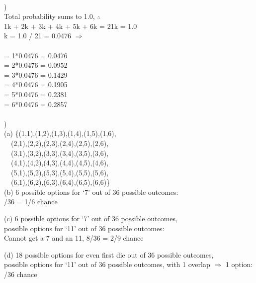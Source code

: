 \documentclass[12pt]{article}
\begin{document}
\hrulefill \\
\pagebreak


)\\
\indent \indent Total probability sums to 1.0, $\therefore$\\
\indent \indent 1k + 2k + 3k + 4k + 5k + 6k = 21k = 1.0\\
\indent \indent k = 1.0 / 21 = 0.0476 $\Rightarrow$\\\\
\indent \indent [1] = 1*0.0476 = 0.0476\\
\indent \indent [2] = 2*0.0476 = 0.0952\\
\indent \indent [3] = 3*0.0476 = 0.1429\\
\indent \indent [4] = 4*0.0476 = 0.1905\\
\indent \indent [5] = 5*0.0476 = 0.2381\\
\indent \indent [6] = 6*0.0476 = 0.2857\\


\hrulefill \\


)\\
\indent (a) \{(1,1),(1,2),(1,3),(1,4),(1,5),(1,6),\\
\indent \indent \  \ (2,1),(2,2),(2,3),(2,4),(2,5),(2,6),\\
\indent \indent \  \ (3,1),(3,2),(3,3),(3,4),(3,5),(3,6),\\
\indent \indent \  \ (4,1),(4,2),(4,3),(4,4),(4,5),(4,6),\\
\indent \indent \  \ (5,1),(5,2),(5,3),(5,4),(5,5),(5,6),\\
\indent \indent \  \ (6,1),(6,2),(6,3),(6,4),(6,5),(6,6)\}\\

(b) 6 possible options for `7' out of 36 possible outcomes:\\
\indent {}/36 = 1/6 chance

(c) 6 possible options for `7' out of 36 possible outcomes,\\
\indent {} possible options for `11' out of 36 possible outcomes:\\
\indent \indent Cannot get a 7 and an 11, 8/36 = 2/9 chance

(d) 18 possible options for even first die out of 36 possible outcomes,\\
\indent {} possible options for `11' out of 36 possible outcomes, with 1 overlap $\Rightarrow$ 1 option:\\
\indent {}/36 chance
\end{document}
